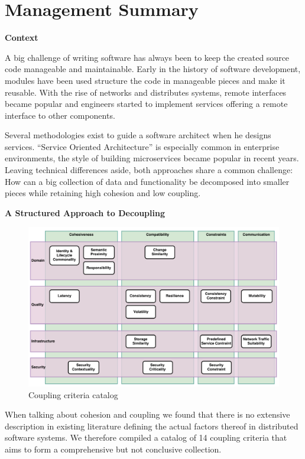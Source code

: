 \chapter{Management Summary}


\textbf{Context}

A big challenge of writing software has always been to keep the created source code manageable and maintainable. Early in the history of software development, modules have been used structure the code in manageable pieces and make it reusable. With the rise of networks and distributes systems, remote interfaces became popular and engineers started to implement services offering a remote interface to other components.

Several methodologies exist to guide a software architect when he designs services. \enquote{Service Oriented Architecture} is especially common in enterprise environments, the style of building microservices became popular in recent years. Leaving technical differences aside, both approaches share a common challenge: How can a big collection of data and functionality be decomposed into smaller pieces while retaining high cohesion and low coupling.

\textbf{A Structured Approach to Decoupling}

\begin{figure}
	\includegraphics[scale=0.4]{diagrams/CouplingCatalog.pdf}
	\caption{Coupling criteria catalog}
	\label{fig:cc-catalog-mgmt-summary}
\end{figure}

When talking about cohesion and coupling we found that there is no extensive description in existing literature defining the actual factors thereof in distributed software systems. We therefore compiled a catalog of 14 coupling criteria that aims to form a comprehensive but not conclusive collection. 


